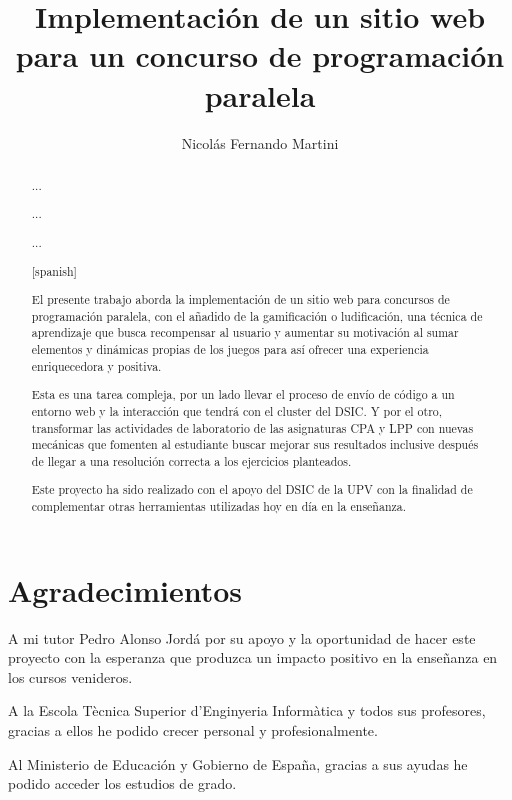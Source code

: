 \documentclass[11pt,spanish,listoffigures,listoftables]{tfgetsinf}
\title{Implementación de un sitio web para un concurso de programación paralela}
\author{Nicolás Fernando Martini}
\newenvironment{dedication}
{%
	\thispagestyle{empty}%
	\itshape             %
}
{\par %
	\vspace{\stretch{3}} %
	\clearpage           %
}
\begin{document}
	

\begin{dedication}	
	
	\chapter*{Agradecimientos}
		A mi tutor Pedro Alonso Jordá por su apoyo y la oportunidad de hacer este proyecto con la esperanza que produzca un impacto positivo en la enseñanza en los cursos venideros. \par
		A la Escola Tècnica Superior d'Enginyeria Informàtica y todos sus profesores, gracias a ellos he podido crecer personal y profesionalmente. \par
		Al Ministerio de Educación y Gobierno de España, gracias a sus ayudas he podido acceder los estudios de grado.
		
\end{dedication}

\begin{abstract}

... \par

... \par

... \par

\end{abstract}

\begin{abstract}[spanish]
	
El presente trabajo aborda la implementación de un sitio web para concursos de programación paralela, con el añadido de la gamificación o ludificación, una técnica de aprendizaje que busca recompensar al usuario y aumentar su motivación al sumar elementos y dinámicas propias de los juegos para así ofrecer una experiencia enriquecedora y positiva. \par 

Esta es una tarea compleja, por un lado llevar el proceso de envío de código a un entorno web y la interacción que tendrá con el cluster \kahan del DSIC. Y por el otro, transformar las actividades de laboratorio de las asignaturas CPA y LPP con nuevas mecánicas que fomenten al estudiante buscar mejorar sus resultados inclusive después de llegar a una resolución correcta a los ejercicios planteados. \par

Este proyecto ha sido realizado con el apoyo del DSIC de la UPV con la finalidad de complementar otras herramientas utilizadas hoy en día en la enseñanza. \par

\end{abstract}
\end{document}
